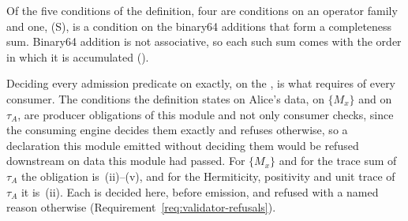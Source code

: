 
Of the five conditions of the definition, four are conditions on an operator
family and one, (S), is a condition on the binary64 additions that form a
completeness sum. Binary64 addition is not associative, so each such sum comes
with the order in which it is accumulated
().

Deciding every admission predicate on  exactly, on the
, is what  requires of
every consumer.
The conditions the definition states on Alice's data, on $\{M_x\}$ and on
$\tau_A$, are producer obligations of this module and not only consumer
checks, since the consuming engine decides them exactly and refuses
otherwise, so a declaration this module emitted without deciding them would
be refused downstream on data this module had passed. For $\{M_x\}$ and
for the trace sum of $\tau_A$ the obligation is
\,(ii)--(v), and for the Hermiticity,
positivity and unit trace of $\tau_A$ it is
\,(ii). Each is decided here, before
emission, and refused with a named reason otherwise
(Requirement~\ref{req:validator-refusals}).

